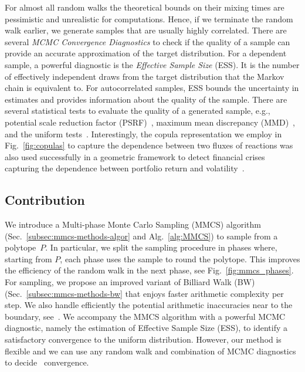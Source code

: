    For almost all random walks the theoretical bounds on their mixing times are
   pessimistic and unrealistic for  computations. Hence,
   if we terminate the random walk earlier, we generate samples that are  usually highly correlated.
   There are several \textit{MCMC Convergence Diagnostics} \citep{Roy20} to check
   if  the quality of a  sample can  provide an accurate
   approximation of the target distribution. For a dependent sample, a powerful
   diagnostic is the \textit {Effective Sample Size} (ESS). It is the number of
   effectively independent draws from the target distribution that the Markov chain
   is equivalent to. For autocorrelated samples, ESS bounds
   the uncertainty in estimates \citep{geyer92} and provides  information about
   the quality of the sample. There are several statistical tests to evaluate the quality of a generated sample, e.g., potential scale reduction factor (PSRF)~\citep{Gelman92}, maximum mean discrepancy (MMD)~\citep{Gretton12},
   and the uniform tests~\citep{CousinsThesis17}.
   Interestingly, 
   the copula representation we employ in Fig.~\ref{fig:copulas} to capture the dependence between two fluxes of reactions was also used  successfully in a geometric framework to detect financial crises capturing the dependence between portfolio return and volatility~\citep{Cales18}.

\subsection{Contribution}
\label{sec:mmcs-contribution}


   We introduce a Multi-phase Monte Carlo Sampling (MMCS) algorithm
   (Sec.~\ref{subsec:mmcs-methods-algor} and Alg.~\ref{alg:MMCS}) to sample from a polytope~$P$. In
   particular, we split the sampling procedure in phases where, starting from $P$,
   each phase uses the sample to round the polytope. This improves the efficiency
   of the random walk in the next phase, see Fig.~\ref{fig:mmcs_phases}.
   For sampling, we propose an improved variant of Billiard Walk (BW)
   (Sec.~\ref{subsec:mmcs-methods-bw} that enjoys faster
   arithmetic complexity per step. We also handle efficiently the potential arithmetic inaccuracies near to the boundary, see~\citep{ChePioCaz18}.
   We accompany the MMCS algorithm with a powerful MCMC diagnostic, namely the
   estimation of Effective Sample Size (ESS), to identify a satisfactory
   convergence to the uniform distribution.
   However, our method is flexible and  we can
   use any  random walk and
   combination of MCMC diagnostics to decide~
   convergence.

